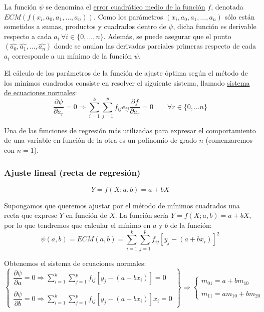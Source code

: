 La función $\psi$ se denomina el \underline{error cuadrático medio de la función} $f$, denotada $ECM(f(x_i, a_0, a_1, \ldots, a_n))$.
Como los parámetros $(x_i, a_0, a_1, \ldots, a_n)$ sólo están sometidos a sumas, productos y cuadrados dentro de $\psi$,
dicha función es derivable respecto a cada $a_i \ \forall i \in \{0, \ldots, n\}$. Además, se puede asegurar que
el punto $(\hat{a_0}, \hat{a_1}, \ldots, \hat{a_n})$ donde se anulan las derivadas parciales primeras respecto
de cada $a_i$ corresponde a un mínimo de la función $\psi$.


El cálculo de los parámetros de la función de ajuste óptima según el método de los mínimos cuadrados consiste en
resolver el siguiente sistema, llamado \underline{sistema de ecuaciones normales}:
$$\dfrac{\partial \psi}{\partial a_r}=0 \Rightarrow \sum_{i=1}^k \sum_{j=1}^p f_{ij} e_{ij}
    \dfrac{\partial f}{\partial a_r} = 0 \qquad \forall r \in \{0, \ldots n\}$$


Una de las funciones de regresión más utilizadas para expresar el comportamiento de una variable en función de la otra
es un polinomio de grado $n$ (comenzaremos con $n=1$).

\subsubsection{Ajuste lineal (recta de regresión)}\vspace{-0.5cm}
\begin{equation*}
    Y=f(X;a,b) = a + bX
\end{equation*}

Supongamos que queremos ajustar por el método de mínimos cuadrados una recta que exprese $Y$ en función de $X$.
La función sería $Y=f(X;a,b) = a + bX$, por lo que tendremos que calcular el mínimo en $a$ y $b$ de la función:
$$\psi(a,b) = ECM(a,b) = \sum_{i=1}^k \sum_{j=1}^p f_{ij} [y_j - (a + bx_i)]^2 $$

Obtenemos el sistema de ecuaciones normales:
\begin{equation*}
    \left\{
    \begin{array}{l}
        \dfrac{\partial \psi}{\partial a} = 0 \Rightarrow \displaystyle\sum_{i=1}^k \sum_{j=1}^p f_{ij} [y_j - (a+bx_i)]=0\\ \\
        \dfrac{\partial \psi}{\partial b} = 0 \Rightarrow \displaystyle\sum_{i=1}^k \sum_{j=1}^p f_{ij} [y_j - (a+bx_i)]x_i=0
    \end{array}
    \right\} \Longrightarrow
    \left\{
    \begin{array}{l}
        m_{01} = a + b m_{10}\\ \\
        m_{11} = a m_{10} + bm_{20}
    \end{array}
    \right.
\end{equation*}


